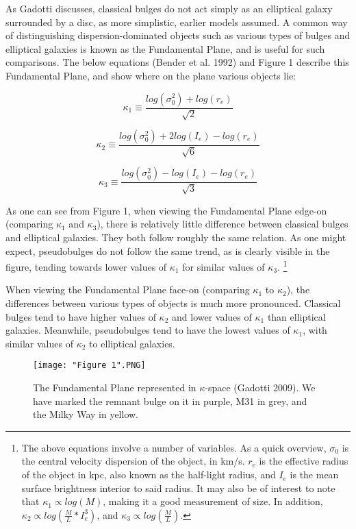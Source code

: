 \documentclass[iop]{emulateapj}
\begin{document}
As Gadotti discusses, classical bulges do not act simply as an elliptical galaxy surrounded by a disc, as more simplistic, earlier models assumed. A common way of distinguishing dispersion-dominated objects such as various types of bulges and elliptical galaxies is known as the Fundamental Plane, and is useful for such comparisons. The below equations (Bender et al. 1992) and Figure 1 describe this Fundamental Plane, and show where on the plane various objects lie:

\begin{equation}
\kappa_1 \equiv \frac{log(\sigma^2_0) + log(r_e)}{\sqrt{2}}
\end{equation}

\begin{equation}
\kappa_2 \equiv \frac{log(\sigma^2_0) + 2 log(I_e) - log(r_e)}{\sqrt{6}}
\end{equation}

\begin{equation}
\kappa_3 \equiv \frac{log(\sigma^2_0) - log(I_e) - log(r_e)}{\sqrt{3}}
\end{equation}

As one can see from Figure 1, when viewing the Fundamental Plane edge-on (comparing $\kappa_1$ and $\kappa_3$), there is relatively little difference between classical bulges and elliptical galaxies. They both follow roughly the same relation. As one might expect, pseudobulges do not follow the same trend, as is clearly visible in the figure, tending towards lower values of $\kappa_1$ for similar values of $\kappa_3$. \footnote{The above equations involve a number of variables. As a quick overview, $\sigma_0$ is the central velocity dispersion of the object, in km/s. $r_e$ is the effective radius of the object in kpc, also known as the half-light radius, and $I_e$ is the mean surface brightness interior to said radius. It may also be of interest to note that $\kappa_1 \propto log(M)$, making it a good measurement of size. In addition, $\kappa_2 \propto log(\frac{M}{L} * I_e^3)$, and $\kappa_3 \propto log(\frac{M}{L})$.}

When viewing the Fundamental Plane face-on (comparing $\kappa_1$ to $\kappa_2$), the differences between various types of objects is much more pronounced. Classical bulges tend to have higher values of $\kappa_2$ and lower values of $\kappa_1$ than elliptical galaxies. Meanwhile, pseudobulges tend to have the lowest values of $\kappa_1$, with similar values of $\kappa_2$ to elliptical galaxies. 

\begin{figure}
    \centering
    \texttt{[image: "Figure 1".PNG]}
    \caption{The Fundamental Plane represented in $\kappa$-space (Gadotti 2009). We have marked the remnant bulge on it in purple, M31 in grey, and the Milky Way in yellow.}
\end{figure}
\end{document}

